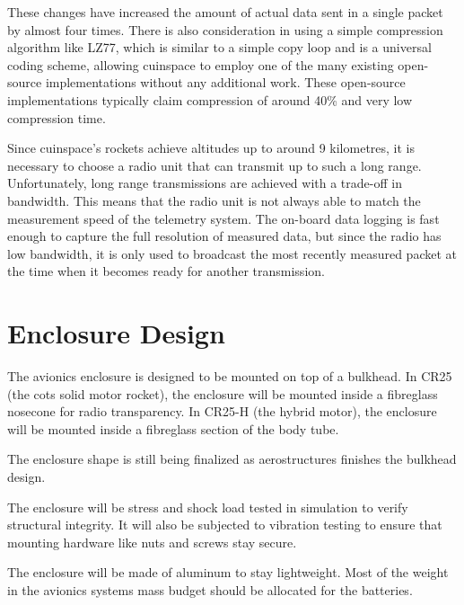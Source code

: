 These changes have increased the amount of actual data sent in a single packet by almost four times. There is also
consideration in using a simple compression algorithm like LZ77, which is similar to a simple copy loop and is a universal
coding scheme, allowing \gls{cuinspace} to employ one of the many existing open-source implementations without any
additional work. \cite{lz77-paper} These open-source implementations typically claim compression of around 40\% and very
low compression time. \cite{liblzf}

Since \gls{cuinspace}'s rockets achieve altitudes up to around 9 kilometres, it is necessary to choose a radio unit
that can transmit up to such a long range. Unfortunately, long range transmissions are achieved with a trade-off in
bandwidth. This means that the radio unit is not always able to match the measurement speed of the telemetry system.
The on-board data logging is fast enough to capture the full resolution of measured data, but since the radio has low
bandwidth, it is only used to broadcast the most recently measured packet at the time when it becomes ready for another
transmission.

\section{Enclosure Design}

The avionics enclosure is designed to be mounted on top of a bulkhead. In CR25 (the \gls{cots} solid motor rocket), the
enclosure will be mounted inside a fibreglass nosecone for radio transparency. In CR25-H (the hybrid motor), the
enclosure will be mounted inside a fibreglass section of the body tube.

The enclosure shape is still being finalized as aerostructures finishes the bulkhead design.

The enclosure will be stress and shock load tested in simulation to verify structural integrity. It will also be
subjected to vibration testing to ensure that mounting hardware like nuts and screws stay secure.

The enclosure will be made of aluminum to stay lightweight. Most of the weight in the avionics systems mass budget
should be allocated for the batteries.

